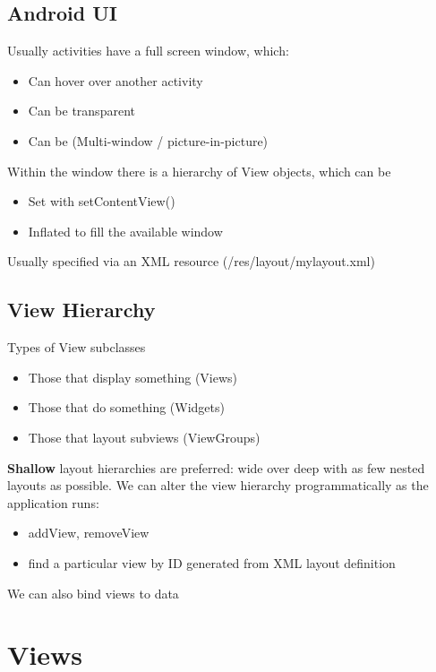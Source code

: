 \documentclass{article}
\begin{document}
\begin{multicols}{2}

\subsection{Android UI}

Usually activities have a full screen window, which:
\begin{itemize}
  \item Can hover over another activity 
  \item Can be transparent
  \item Can be (Multi-window / picture-in-picture)
\end{itemize}
Within the window there is a hierarchy of View objects, which can be
\begin{itemize}
  \item Set with setContentView() 
  \item Inflated to fill the available window
\end{itemize}
Usually specified via an XML resource (/res/layout/mylayout.xml)

\subsection{View	Hierarchy}

Types	of	View	subclasses
\begin{itemize}
  \item Those	that	display	something	(Views)
  \item Those	that	do	something	(Widgets)
  \item Those	that	layout	subviews (ViewGroups)
\end{itemize}
\textbf{Shallow} layout hierarchies are	preferred: wide over deep with as few nested layouts as possible. We can	alter	the	view	hierarchy	programmatically as	the	application	runs:
\begin{itemize}
  \item addView, removeView
  \item find a particular view by ID generated from XML layout definition
\end{itemize}
We can also bind views to data
\end{multicols}

\section{Views}
\end{document}
